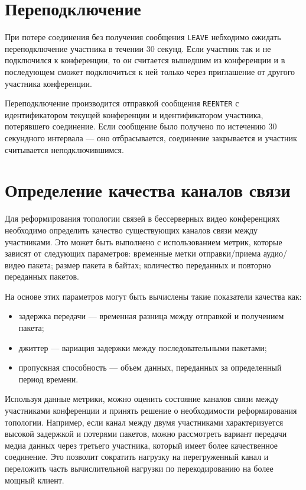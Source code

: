 
\section{Переподключение}

При потере соединения без получения сообщения \texttt{LEAVE} небходимо ожидать переподключение участника в течении 30 секунд. Если участник так и не подключился к конференции, то он считается вышедшим из конференции и в последующем сможет подключиться к ней только через приглашение от другого участника конференции.

Переподключение производится отправкой сообщения \texttt{REENTER} с идентификатором текущей конференции и идентификатором участника, потерявшего соединение. Если сообщение было получено по истечению 30 секундного интервала --- оно отбрасывается, соединение закрывается и участник считывается неподключившимся.

\section{Определение качества каналов связи}

Для реформирования топологии связей в бессерверных видео конференциях необходимо определить качество существующих каналов связи между участниками. Это может быть выполнено с использованием метрик, которые зависят от следующих параметров: временные метки отправки/приема аудио/видео пакета; размер пакета в байтах; количество переданных и повторно переданных пакетов.

На основе этих параметров могут быть вычислены такие показатели качества как:
\begin{itemize}[label=---]
  \item задержка передачи --- временная разница между отправкой и получением пакета;
  \item джиттер --- вариация задержки между последовательными пакетами;
  \item пропускная способность --- объем данных, переданных за определенный период времени.
\end{itemize}

Используя данные метрики, можно оценить состояние каналов связи между участниками конференции и принять решение о необходимости реформирования топологии. Например, если канал между двумя участниками характеризуется высокой задержкой и потерями пакетов, можно рассмотреть вариант передачи медиа данных через третьего участника, который имеет более качественное соединение. Это позволит сократить нагрузку на перегруженный канал и переложить часть вычислительной нагрузки по перекодированию на более мощный клиент.
